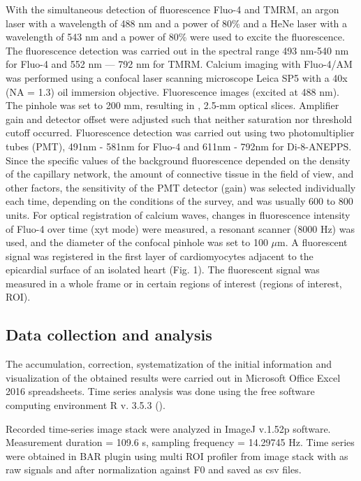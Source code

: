 \documentclass{biophys-new}
\begin{document}
With the simultaneous detection of fluorescence Fluo-4 and TMRM, an argon laser with a wavelength of 488 nm and a power of 80\% and a HeNe laser with a wavelength of 543 nm and a power of 80\% were used to excite the fluorescence.
The fluorescence detection was carried out in the spectral range 493 nm-540 nm for Fluo-4 and 552 nm --- 792 nm for TMRM.
Calcium imaging with Fluo-4/AM was performed using a confocal laser scanning microscope Leica SP5 with a 40x (NA = 1.3) oil immersion objective. Fluorescence images (excited at 488 nm).
The pinhole was set to 200 mm, resulting in , 2.5-mm optical slices. Amplifier gain and detector offset were adjusted such that neither saturation nor threshold cutoff occurred.
Fluorescence detection was carried out using two photomultiplier tubes (PMT), 491nm - 581nm for Fluo-4 and 611nm - 792nm for Di-8-ANEPPS.
Since the specific values of the background fluorescence depended on the density of the capillary network, the amount of connective tissue in the field of view, and other factors, the sensitivity of the PMT detector (gain) was selected individually each time, depending on the conditions of the survey, and was usually 600 to 800 units.
For optical registration of calcium waves, changes in fluorescence intensity of Fluo-4 over time (xyt mode) were measured, a resonant scanner (8000 Hz) was used, and the diameter of the confocal pinhole was set to 100 $\mu$m.
A fluorescent signal was registered in the first layer of cardiomyocytes adjacent to the epicardial surface of an isolated heart (Fig. 1). The fluorescent signal was measured in a whole frame or in certain regions of interest (regions of interest, ROI).


\subsection*{Data collection and analysis}

The accumulation, correction, systematization of the initial information and visualization of the obtained results were carried out in Microsoft Office Excel 2016 spreadsheets.
Time series analysis was done using the free software computing environment R v. 3.5.3 (\cite{team2014r}).


Recorded time-series image stack were analyzed in ImageJ v.1.52p software\cite{rueden2017imagej2}.
Measurement duration = 109.6 s,  sampling frequency = 14.29745 Hz.
Time series were obtained in BAR plugin using multi ROI profiler from image stack with as raw signals and after normalization against F0 and saved as csv files.
\end{document}

